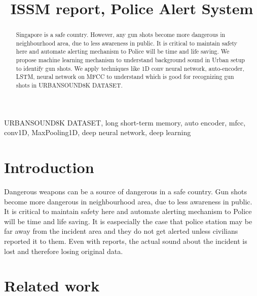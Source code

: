 \documentclass{article}
\title{ISSM report, Police Alert System}
\begin{document}
%
\maketitle
%
\begin{abstract}

Singapore is a safe country. However, any gun shots become more dangerous in neighbourhood area, due to less awareness in public. It is critical to maintain safety here and automate alerting mechanism to Police will be time and life saving. 
We propose machine learning mechanism to understand background sound in Urban setup to identify gun shots. We apply techniques like 1D conv neural network, auto-encoder, LSTM, neural network on MFCC to understand which is good for recognizing gun shots in URBANSOUND8K DATASET.
 

\end{abstract}
%
\begin{keywords}
URBANSOUND8K DATASET, long short-term memory, auto encoder, mfcc, conv1D, MaxPooling1D, deep neural network, deep learning
\end{keywords}
%
\section{Introduction}
\label{sec:intro}


Dangerous weapons can be a source of dangerous in a safe country.  Gun shots become more dangerous in neighbourhood area, due to less awareness in public. It is critical to maintain safety here and automate alerting mechanism to Police will be time and life saving. It is easpecially the case that police station may be far away from the incident area and they do not get alerted unless civilians reported it to them. Even with reports, the actual sound about the incident is lost and therefore losing original data.




\section{Related work}
\end{document}
